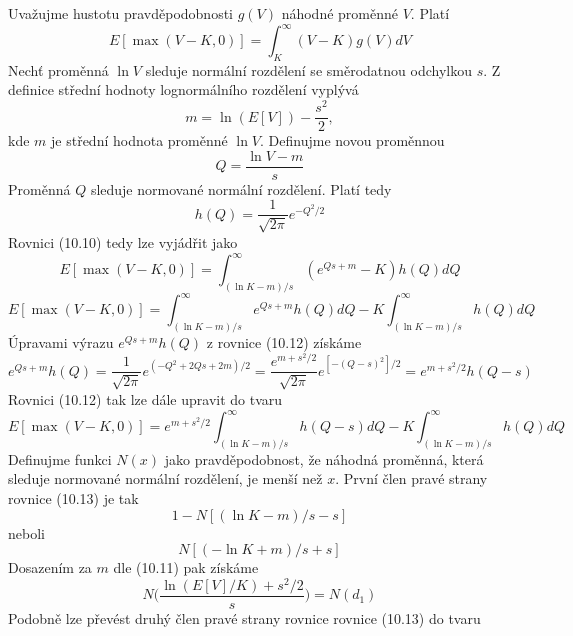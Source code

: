 \documentclass[a4paper]{book}
\begin{document}
Uvažujme hustotu pravděpodobnosti $g(V)$ náhodné proměnné $V$. Platí
\begin{equation}
E[\max(V-K,0)]= \int_K^\infty (V-K) g(V) dV
\end{equation}
Nechť proměnná $\ln V$ sleduje normální rozdělení se směrodatnou odchylkou $s$. Z definice střední hodnoty lognormálního rozdělení vyplývá
\begin{equation}
m=\ln(E[V])-\frac{s^2}{2},
\end{equation}
kde $m$ je střední hodnota proměnné $\ln V$. Definujme novou proměnnou
\begin{equation*}
Q=\frac{\ln V - m}{s}
\end{equation*}
Proměnná $Q$ sleduje normované normální rozdělení. Platí tedy
\begin{equation*}
h(Q)=\frac{1}{\sqrt{2 \pi}}e^{-Q^2/2}
\end{equation*}
Rovnici (10.10) tedy lze vyjádřit jako
\begin{equation*}
E[\max(V-K,0)] = \int_{(\ln K - m)/s}^\infty (e^{Qs+m}-K)h(Q)dQ
\end{equation*}
\begin{equation}
E[\max(V-K,0)] = \int_{(\ln K - m)/s}^\infty e^{Qs+m}h(Q)dQ-K \int_{(\ln K - m)/s}^\infty h(Q)dQ
\end{equation}
Úpravami výrazu $e^{Qs+m}h(Q)$ z rovnice (10.12) získáme
\begin{equation*}
e^{Qs+m}h(Q)=\frac{1}{\sqrt{2 \pi}}e^{(-Q^2+2Qs+2m)/2}=\frac{e^{m+s^2/2}}{\sqrt{2 \pi}}e^{[-(Q-s)^2]/2}=e^{m+s^2/2}h(Q-s)
\end{equation*}
Rovnici (10.12) tak lze dále upravit do tvaru
\begin{equation}
E[\max(V-K,0)]=e^{m+s^2/2} \int_{(\ln K - m)/s}^\infty h(Q-s)dQ - K \int_{(\ln K - m)/s}^\infty h(Q)dQ
\end{equation}
Definujme funkci $N(x)$ jako pravděpodobnost, že náhodná proměnná, která sleduje normované normální rozdělení, je menší než $x$. První člen pravé strany rovnice (10.13) je tak
\begin{equation*}
1-N[(\ln K - m)/s-s]
\end{equation*}
neboli
\begin{equation*}
N[(-\ln K + m)/s+s]
\end{equation*}
Dosazením za $m$ dle (10.11) pak získáme
\begin{equation*}
N \bigg( \frac{\ln(E[V]/K)+s^2/2}{s}\bigg)=N(d_1)
\end{equation*}
Podobně lze převést druhý člen pravé strany rovnice rovnice (10.13) do tvaru
\end{document}
